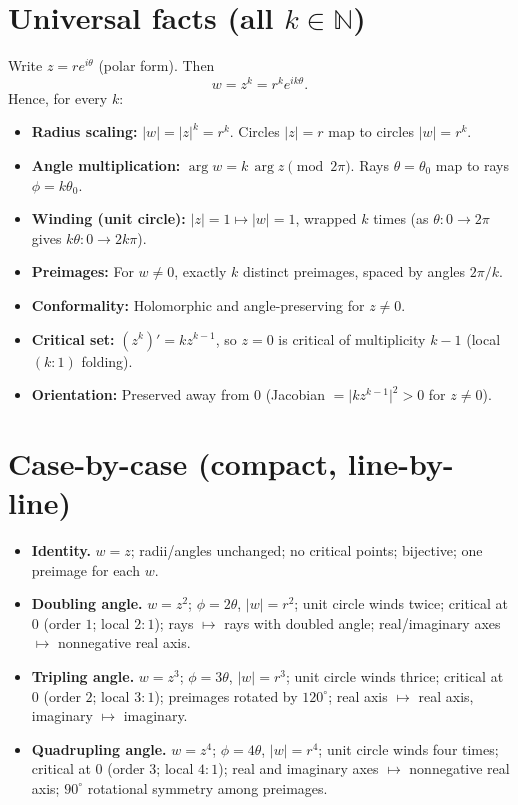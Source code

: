 \documentclass[11pt]{article}
\begin{document}
\section*{Universal facts (all $k\in\mathbb N$)}
Write $z=re^{i\theta}$ (polar form). Then
\[
w=z^{k}=r^{k}e^{ik\theta}.
\]
Hence, for every $k$:
\begin{itemize}
	\item \textbf{Radius scaling:} $\lvert w\rvert=\lvert z\rvert^{k}=r^{k}$. Circles $\lvert z\rvert=r$ map to circles $\lvert w\rvert=r^{k}$.
	\item \textbf{Angle multiplication:} $\arg w=k\,\arg z \pmod{2\pi}$. Rays $\theta=\theta_{0}$ map to rays $\phi=k\theta_{0}$.
	\item \textbf{Winding (unit circle):} $\lvert z\rvert=1 \mapsto \lvert w\rvert=1$, wrapped $k$ times (as $\theta:0\to 2\pi$ gives $k\theta:0\to 2k\pi$).
	\item \textbf{Preimages:} For $w\neq 0$, exactly $k$ distinct preimages, spaced by angles $2\pi/k$.
	\item \textbf{Conformality:} Holomorphic and angle-preserving for $z\neq 0$.
	\item \textbf{Critical set:} $(z^{k})'=k z^{k-1}$, so $z=0$ is critical of multiplicity $k-1$ (local $(k{:}1)$ folding).
	\item \textbf{Orientation:} Preserved away from $0$ (Jacobian $=\lvert k z^{k-1}\rvert^{2}>0$ for $z\neq 0$).
\end{itemize}

\section*{Case-by-case (compact, line-by-line)}
\begin{itemize}
	\item[\(\boldsymbol{k=1}\)] \textbf{Identity.} $w=z$; radii/angles unchanged; no critical points; bijective; one preimage for each $w$.
	
	\item[\(\boldsymbol{k=2}\)] \textbf{Doubling angle.} $w=z^{2}$; $\phi=2\theta$, $\lvert w\rvert=r^{2}$; unit circle winds twice; critical at $0$ (order $1$; local $2{:}1$); rays $\mapsto$ rays with doubled angle; real/imaginary axes $\mapsto$ nonnegative real axis.
	
	\item[\(\boldsymbol{k=3}\)] \textbf{Tripling angle.} $w=z^{3}$; $\phi=3\theta$, $\lvert w\rvert=r^{3}$; unit circle winds thrice; critical at $0$ (order $2$; local $3{:}1$); preimages rotated by $120^\circ$; real axis $\mapsto$ real axis, imaginary $\mapsto$ imaginary.
	
	\item[\(\boldsymbol{k=4}\)] \textbf{Quadrupling angle.} $w=z^{4}$; $\phi=4\theta$, $\lvert w\rvert=r^{4}$; unit circle winds four times; critical at $0$ (order $3$; local $4{:}1$); real and imaginary axes $\mapsto$ nonnegative real axis; $90^\circ$ rotational symmetry among preimages.
\end{itemize}
\end{document}
